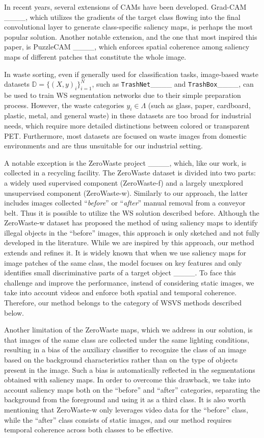 In recent years, several extensions of CAMs have been developed. Grad-CAM ____, which utilizes the gradients of the target class flowing into the final convolutional layer to generate class-specific saliency maps, is perhaps the most popular solution. Another notable extension, and the one that most inspired this paper, is PuzzleCAM ____, which enforces spatial coherence among saliency maps of different patches that constitute the whole image.

In waste sorting, even if generally used for classification tasks, image-based waste datasets \( \mathbb{D} = \{(X, y)_i\}_{i=1}^N \), such as \texttt{TrashNet}____ and \texttt{TrashBox}____, can be used to train WS segmentation networks due to their simple preparation process. However, the waste categories \( y_i \in \Lambda \) (such as glass, paper, cardboard, plastic, metal, and general waste) in these datasets are too broad for industrial needs, which require more detailed distinctions between colored or transparent PET. Furthermore, most datasets are focused on waste images from domestic environments and are thus unsuitable for our industrial setting. 

A notable exception is the ZeroWaste project ____, which, like our work, is collected in a recycling facility. The ZeroWaste dataset is divided into two parts: a widely used supervised component (ZeroWaste-f) and a largely unexplored unsupervised component (ZeroWaste-w). Similarly to our approach, the latter includes images collected “\textit{before}” or “\textit{after}” manual removal from a conveyor belt. Thus it is possible to utilize the WS solution described before. Although the ZeroWaste-w dataset has proposed the method of using saliency maps to identify illegal objects in the ``before'' images, this approach is only sketched and not fully developed in the literature. While we are inspired by this approach, our method extends and refines it. It is widely known that when we use saliency maps for image patches of the same class, the model focuses on key features and only identifies small discriminative parts of a target object ____.
%
To face this challenge and improve the performance, instead of considering static images, we take into account videos and enforce both spatial and temporal coherence. Therefore, our method belongs to the category of WSVS methods described below. 

Another limitation of the ZeroWaste maps, which we address in our solution, is that images of the same class are collected under the same lighting conditions, resulting in a bias of the auxiliary classifier to recognize the class of an image based on the background characteristics rather than on the type of objects present in the image. Such a bias is automatically reflected in the segmentations obtained with saliency maps. In order to overcome this drawback, we take into account saliency maps both on the ``before'' and ``after'' categories, separating the background from the foreground and using it as a third class. It is also worth mentioning that ZeroWaste-w only leverages video data for the ``before'' class, while the ``after'' class consists of static images, and our method requires temporal coherence across both classes to be effective.
